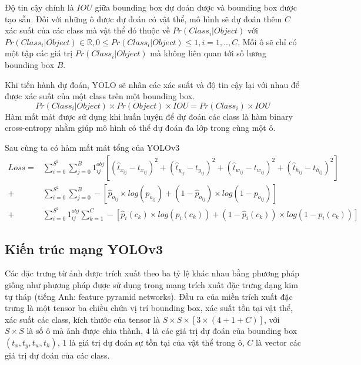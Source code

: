 Độ tin cậy chính là $IOU$ giữa bounding box dự đoán được và bounding box được tạo sẵn. Đối với những ô được dự đoán có vật thể, mô hình sẽ dự đoán thêm $C$ xác suất của các class mà vật thể đó thuộc về $Pr \left( Class_i | Object \right)$ với $Pr \left( Class_i | Object \right) \in \mathbb{R}, 0 \leq Pr \left( Class_i | Object \right) \leq 1, i=1,..,C$. Mỗi ô sẽ chỉ có một tập các giá trị $Pr \left( Class_i | Object \right)$ mà không liên quan tới số lương bounding box $B$.

Khi tiến hành dự đoán, YOLO sẽ nhân các xác suất và độ tin cậy lại với nhau để được xác suất của một class trên một bounding box. 
\begin{equation}
	Pr \left( Class_i | Object \right) \times Pr(Object) \times IOU = Pr \left( Class_i \right) \times IOU
\end{equation}
Hàm mất mát được sử dụng khi huấn luyện để dự đoán các class là hàm binary cross-entropy nhằm giúp mô hình có thể dự đoán đa lớp trong cùng một ô.

Sau cùng ta có hàm mất mát tổng của YOLOv3
\begin{align*}
	Loss =
		&\sum_{i=0}^{S^2} 
		\sum_{j=0}^{B}
		{\mathfrak{1}}^{obj}_{ij}
		\left[
			{
			\left(
				{\widehat{t}}_{x_{ij}}
				-
				t_{x_{ij}}
			\right)
			}^2
			+
			{
			\left(
				{\widehat{t}}_{y_{ij}}
				-
				t_{y_{ij}}
			\right)
			}^2
			+
			{
			\left(
				{\widehat{t}}_{w_{ij}}
				-
				t_{w_{ij}}
			\right)
			}^2
			+
			{
			\left(
				{\widehat{t}}_{h_{ij}}
				-
				t_{h_{ij}}
			\right)
			}^2
		\right]\\
		+
		&\sum_{i=0}^{S^2} 
		\sum_{j=0}^{B}
		-
		\left[
			{\widehat{p}}_{o_{ij}}
			\times
			log	\left(
					p_{o_{ij}}
				\right)
			+
			\left(
				1 
				- 
				{\widehat{p}}_{o_{ij}}
			\right)
			\times
			log	\left(
					1
					-
					p_{o_{ij}}
				\right)
		\right]\\
		+
		&\sum_{i=0}^{S^2} 
		{\mathfrak{1}}^{obj}_{ij}
		\sum_{k=1}^{C}
		-
		\left[
			{\widehat{p}}_{i} \left( c_k \right)
			\times
			log	\left(
					p_{i} \left( c_k \right)
				\right)
			+
			\left(
				1 
				- 
				{\widehat{p}}_{i} \left( c_k \right)
			\right)
			\times
			log	\left(
					1
					-
					p_{i} \left( c_k \right)
				\right)
		\right]
\end{align*}
\subsection{Kiến trúc mạng YOLOv3}
Các đặc trưng từ ảnh được trích xuất theo ba tỷ lệ khác nhau bằng phương pháp giống như phương pháp được sử dụng trong mạng trích xuất đặc trưng dạng kim tự tháp (tiếng Anh: feature pyramid networks). Đầu ra của miền trích xuất đặc trưng là một tensor ba chiều chứa vị trí bounding box, xác suất tồn tại vật thể, xác suất các class, kích thước của tensor là $S \times S \times [3 \times (4 + 1 + C)]$, với $S \times S$ là số ô mà ảnh được chia thành, $4$ là các giá trị dự đoán của bounding box $\left( t_x,t_y,t_w,t_h \right)$, $1$ là giá trị dự đoán sự tồn tại của vật thể trong ô, $C$ là vector các giá trị dự đoán của các class.


